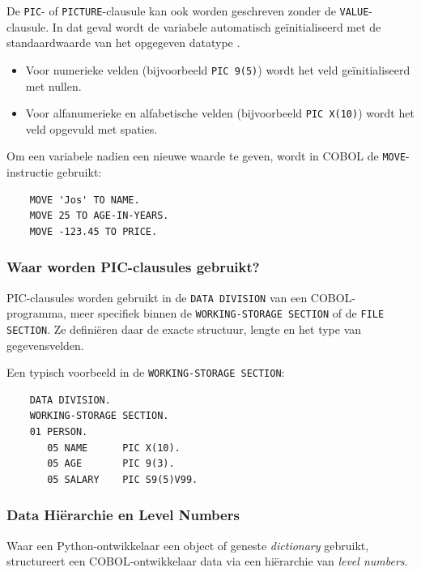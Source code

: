 De \texttt{PIC}- of \texttt{PICTURE}-clausule kan ook worden geschreven zonder de \texttt{VALUE}-clausule. 
In dat geval wordt de variabele automatisch geïnitialiseerd met de standaardwaarde van het opgegeven datatype \autocite{IBM2023}.

\begin{itemize}
    \item Voor numerieke velden (bijvoorbeeld \texttt{PIC 9(5)}) wordt het veld geïnitialiseerd met nullen.
    \item Voor alfanumerieke en alfabetische velden (bijvoorbeeld \texttt{PIC X(10)}) wordt het veld opgevuld met spaties.
\end{itemize}

Om een variabele nadien een nieuwe waarde te geven, wordt in COBOL de \texttt{MOVE}-instructie gebruikt:

\begin{listing}[H]
  \begin{verbatim}
    MOVE 'Jos' TO NAME.
    MOVE 25 TO AGE-IN-YEARS.
    MOVE -123.45 TO PRICE.
  \end{verbatim}
  \caption[MOVE in COBOL]{MOVE in COBOL.}
  \label{lst:cobol_move}
\end{listing}

\subsubsection{Waar worden PIC-clausules gebruikt?}

PIC-clausules worden gebruikt in de \texttt{DATA DIVISION} van een COBOL-programma, 
meer specifiek binnen de \texttt{WORKING-STORAGE SECTION} of de \texttt{FILE SECTION}. 
Ze definiëren daar de exacte structuur, lengte en het type van gegevensvelden.

Een typisch voorbeeld in de \texttt{WORKING-STORAGE SECTION}:

\begin{listing}[H]
  \begin{verbatim}
    DATA DIVISION.
    WORKING-STORAGE SECTION.
    01 PERSON.
       05 NAME      PIC X(10).
       05 AGE       PIC 9(3).
       05 SALARY    PIC S9(5)V99.
  \end{verbatim}
  \caption[Voorbeeld van WORKING-STORAGE SECTION]{Voorbeeld van WORKING-STORAGE SECTION.}
  \label{lst:cobol_ws}
\end{listing}

\subsubsection{Data Hiërarchie en Level Numbers}
Waar een Python-ontwikkelaar een object of geneste \textit{dictionary} gebruikt, structureert een COBOL-ontwikkelaar data via een hiërarchie van \textit{level numbers}.


